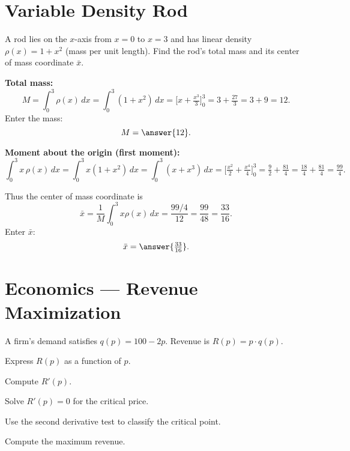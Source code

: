 \documentclass{ximera}
\begin{document}
\section*{Variable Density Rod}

\begin{problem}
A rod lies on the $x$-axis from $x=0$ to $x=3$ and has linear density $\rho(x)=1+x^2$ (mass per unit length). Find the rod's total mass and its center of mass coordinate $\bar x$.
\end{problem}

\begin{solution}
\textbf{Total mass:}
\[
M=\int_0^3 \rho(x)\,dx = \int_0^3 (1+x^2)\,dx
= \Big[x+\tfrac{x^3}{3}\Big]_0^3 = 3 + \tfrac{27}{3} = 3+9 = 12.
\]
Enter the mass:
\[
M=\answer{12}.
\]

\textbf{Moment about the origin (first moment):}
\[
\int_0^3 x\,\rho(x)\,dx = \int_0^3 x(1+x^2)\,dx
= \int_0^3 (x + x^3)\,dx
= \Big[\tfrac{x^2}{2} + \tfrac{x^4}{4}\Big]_0^3
= \tfrac{9}{2} + \tfrac{81}{4} = \tfrac{18}{4} + \tfrac{81}{4} = \tfrac{99}{4}.
\]

Thus the center of mass coordinate is
\[
\bar x = \frac{1}{M}\int_0^3 x\rho(x)\,dx = \frac{99/4}{12} = \frac{99}{48} = \frac{33}{16}.
\]
Enter $\bar x$:
\[
\bar x=\answer{\tfrac{33}{16}}.
\]
\end{solution}

\section*{Economics — Revenue Maximization}

\begin{problem}
A firm's demand satisfies \(q(p)=100-2p\). Revenue is \(R(p)=p\cdot q(p)\).

Express \(R(p)\) as a function of \(p\).

Compute \(R'(p)\).

Solve \(R'(p)=0\) for the critical price.

Use the second derivative test to classify the critical point.

Compute the maximum revenue.
\end{problem}
\end{document}
